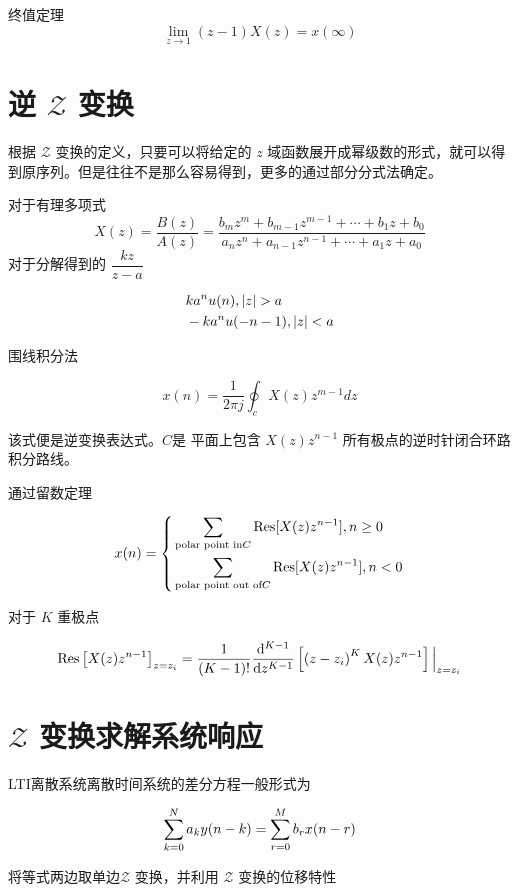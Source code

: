 \documentclass[cn,11pt,chinese,black,simple]{../elegantbook}
\begin{document}
终值定理 \[\lim_{z\rightarrow 1}(z-1)X(z) = x(\infty)\]
  

\section{逆 \(\mathscr{Z}\) 变换}

根据 \(\mathscr{Z}\) 变换的定义，只要可以将给定的 \(z\) 域函数展开成幂级数的形式，就可以得到原序列。但是往往不是那么容易得到，更多的通过部分分式法确定。

对于有理多项式 \[
    X(z)=\dfrac{B(z)}{A(z)}=\dfrac{b_{m} z^{m}+b_{m-1} z^{m-1}+\cdots+b_{1} z+b_{0}}{a_{n} z^{n}+a_{n-1} z^{n-1}+\cdots+a_{1} z+a_{0}}
\]
对于分解得到的 \(\dfrac{k z}{z-a}\)

\[
\begin{aligned}
    &k a^n u(n), \left| z \right| > a\\
    &-k a^n u(-n-1), \left| z \right| < a\\
\end{aligned}    
\]

围线积分法 

\[x(n)=\dfrac{1}{2 \pi j } \oint_{c} X(z) z^{m-1} d z\]

该式便是逆变换表达式。\(C\)是 平面上包含 \(X(z)z^{n-1}\)
所有极点的逆时针闭合环路积分路线。

通过留数定理

\[x(n) = \left\{\begin{aligned}
    & \displaystyle\sum_{\text{polar point in} C} \operatorname{Res}[X(z)z^{n-1}] ,n \geq 0\\
    & \displaystyle\sum_{\text{polar point out of} C} \operatorname{Res}[X(z)z^{n-1}] ,n < 0\\
\end{aligned}\right.
\]

对于 \(K\) 重极点

\[\operatorname{Res}\left[X(z) z^{n-1}\right]_{z=z_{i}}=\dfrac{1}{(K-1) !} \dfrac{ \mathrm{d} ^{K-1}}{ \mathrm{d} z^{K-1}}\left[\left(z-z_{i}\right)^{K} X(z) z^{n-1}\right]\Big|_{z=z_{i}}\]

\section{\(\mathscr{Z}\) 变换求解系统响应}

LTI离散系统离散时间系统的差分方程一般形式为

\[
\displaystyle\sum_{k=0}^{N} a_{k} y(n-k)=\displaystyle\sum_{r=0}^{M} b_{r} x(n-r)
\]

将等式两边取单边\(\mathscr{Z}\) 变换，并利用 \(\mathscr{Z}\) 变换的位移特性
\end{document}
